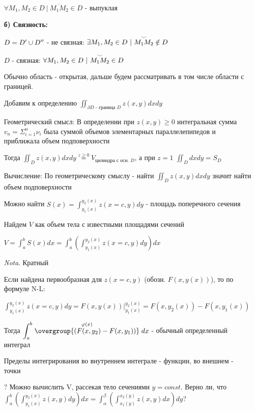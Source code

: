 \documentclass[12pt]{article}
\begin{document}
    $\forall M_1, M_2 \in D \ | \ \overline{M_1 M_2} \in D$ - выпуклая

    \vspace{5mm}
    \textbf{
    б) Связность:}

    $D = D^\prime \cup D^{\prime\prime}$ - не связная: $\exists M_1, M_2 \in D \ | \ \overset{\LARGE\smile}{M_1 M_2} \notin D$

    $D$ - связная: $\forall M_1, M_2 \in D \ | \ \overset{\LARGE\smile}{M_1 M_2} \in D$

    Обычно область - открытая, дальше будем рассматривать в том числе области с границей.

    Добавим к определению $\displaystyle \iint_{\partial D \text{ - граница } D} z(x, y) dx dy$

    Геометрический смысл: В определении при $z(x, y) \geq 0$ интегральная сумма $\displaystyle v_n = \Sigma_{i=1}^n \nu_i$ была суммой объемов элементарных параллелепипедов и приближала объем подповерхности

    Тогда $\displaystyle \iint_D z(x, y) dx dy \stackrel{z \geq 0}{=} V_{\text{цилиндра с осн. } D}$, а при $z = 1$ $\displaystyle \iint_D dx dy = S_D$

    Вычисление: По геометрическому смыслу - найти $\displaystyle \iint_D z(x, y) dx dy$ значит найти объем подповерхности

    Можно найти $\displaystyle S(x) = \int^{y_2(x)}_{y_1(x)} z(x = c, y) dy$ - площадь поперечного сечения

    Найдем $V$ как объем тела с известными площадями сечений

    $\displaystyle V = \int^b_a S(x) dx = \int_a^b \left(\int^{y_2(x)}_{y_1(x)} z(x = c, y) dy\right) dx$

    \vspace{3mm}
\textit{Nota}. Кратный

    Если найдена первообразная для $z(x = c, y)$ (обозн. $F(x, y(x))$), то по формуле N-L:

    $\displaystyle \int^{y_2(x)}_{y_1(x)} z(x = c, y) dy = F(x, y(x)) \Big|^{y_2(x)}_{y_1(x)} = F(x, y_2(x)) - F(x, y_1(x))$

    Тогда $\displaystyle \int^b_a \stackrel{\varphi(x)}{\overgroup{(F(x, y_2) - F(x, y_1))}} dx$ - обычный определенный интеграл

    Пределы интегрирования во внутреннем интеграле - функции, во внешнем - точки

    ? Можно вычислить V, рассекая тело сечениями $y = const$. Верно ли, что $\displaystyle \int_a^b \left(\int_{y_1(x)}^{y_2(x)} z(x, y) dy\right) dx = \int_\alpha^\beta \left(\int_{x_1(y)}^{x_2(y)} z(x, y) dx\right) dy$?
\end{document}
